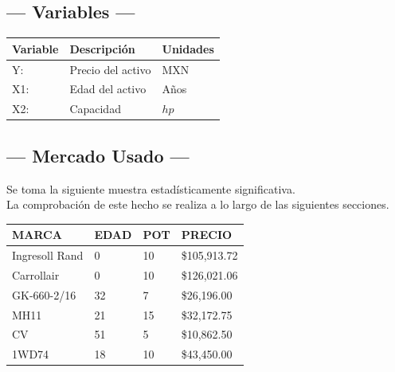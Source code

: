 \subsection{\centering --- Variables ---} %
\begin{center}
  \begin{tabular}{|l|l|l|}
    \hline 
    Variable & Descripción   & Unidades\\ \hline 
    Y:  & Precio del activo  & MXN \\ \hline 
    X1: & Edad del activo    & Años \\ \hline 
		X2: & Capacidad  & \(hp\) \\ \hline 
  \end{tabular}
\end{center} 

\subsection{\centering --- Mercado Usado ---} %
Se toma la siguiente muestra estadísticamente significativa. \\ 
La comprobación de este hecho se realiza a lo largo de las siguientes secciones.
\begin{center}
	\begin{tabular}{*{4}{|p{3cm}}|}
		\hline 
MARCA          & EDAD  & POT  & PRECIO\\ \hline
Ingresoll Rand & 0     & 10   & \$105,913.72\\ \hline
Carrollair     & 0     & 10   & \$126,021.06\\ \hline
GK-660-2/16    & 32    & 7    & \$26,196.00\\ \hline
MH11           & 21    & 15   & \$32,172.75\\ \hline
CV             & 51    & 5    & \$10,862.50\\ \hline
1WD74          & 18    & 10   & \$43,450.00\\ \hline
	\end{tabular}
\end{center}


